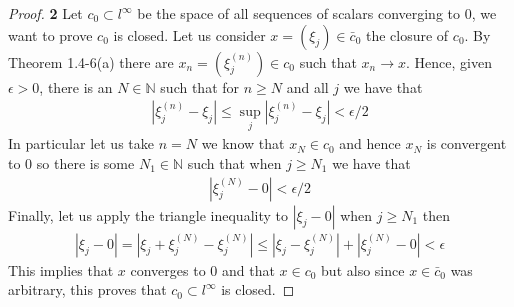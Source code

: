 \documentclass[11pt]{article}
\newcommand{\N}{\mathbb{N}}
\theoremstyle{definition}
\begin{document}
\cleardoublepage
\begin{proof}{\textbf{2}}
    Let $c_0 \subset l^\infty$ be the space of all sequences of scalars
    converging to 0, we want to prove $c_0$ is closed.
    Let us consider $x = (\xi_j) \in \bar{c}_0$ the closure of $c_0$.
    By Theorem 1.4-6(a) there are  $x_n = (\xi_j^{(n)}) \in c_0$ such that
    $x_n \to x$. Hence, given $\epsilon > 0$, there is an $N \in \N$ such that
    for $n \geq N$ and all $j$ we have that
    \begin{align*}
        |\xi_j^{(n)} - \xi_j| \leq \sup_j |\xi_j^{(n)} - \xi_j| < \epsilon/2
    \end{align*}
    In particular let us take $n = N$ we know that $x_N \in c_0$
    and hence $x_N$ is convergent to $0$ so there is some $N_1 \in \N$
    such that when $j \geq N_1$ we have that
    \begin{align*}
        |\xi_j^{(N)} - 0| < \epsilon/2
    \end{align*}
    Finally, let us apply the triangle inequality to $|\xi_j - 0|$
    when $j \geq N_1$ then
    \begin{align*}
        |\xi_j - 0| = |\xi_j + \xi_j^{(N)} - \xi_j^{(N)}|
        \leq |\xi_j - \xi_j^{(N)}| + |\xi_j^{(N)} - 0| < \epsilon
    \end{align*}
    This implies that $x$ converges to $0$ and that $x \in c_0$ but also since
    $x \in \bar{c}_0$ was arbitrary, this proves that $c_0 \subset l^\infty$
    is closed.
\end{proof}
\end{document}
